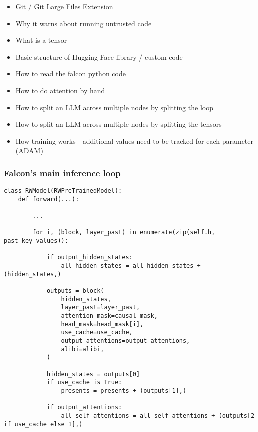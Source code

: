 \documentclass{beamer}
\begin{document}
\begin{frame}
\begin{itemize}
\item Git / Git Large Files Extension
\item Why it warns about running untrusted code
\item What is a tensor
\item Basic structure of Hugging Face library / custom code
\item How to read the falcon python code
\item How to do attention by hand
\item How to split an LLM across multiple nodes by splitting the loop
\item How to split an LLM across multiple nodes by splitting the tensors
\item How training works - additional values need to be tracked for each parameter (ADAM)
\end{itemize}
\end{frame}

\begin{frame}[fragile]
\frametitle{Falcon's main inference loop}
\tiny\begin{verbatim}
class RWModel(RWPreTrainedModel):
    def forward(...):

        ...

        for i, (block, layer_past) in enumerate(zip(self.h, past_key_values)):

            if output_hidden_states:
                all_hidden_states = all_hidden_states + (hidden_states,)

            outputs = block(
                hidden_states,
                layer_past=layer_past,
                attention_mask=causal_mask,
                head_mask=head_mask[i],
                use_cache=use_cache,
                output_attentions=output_attentions,
                alibi=alibi,
            )

            hidden_states = outputs[0]
            if use_cache is True:
                presents = presents + (outputs[1],)

            if output_attentions:
                all_self_attentions = all_self_attentions + (outputs[2 if use_cache else 1],)

\end{verbatim}
\end{frame}
\end{document}
